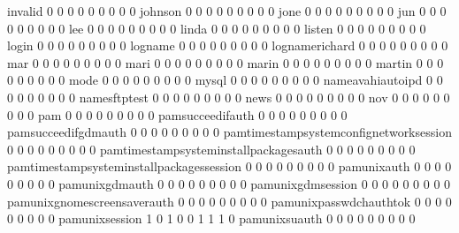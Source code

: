 \documentclass[compress,8pt]{beamer}
\begin{document}
\begin{frame}
\begin{Schunk}
  invalid                                    0   0   0   0   0   0   0   0   0
  johnson                                    0   0   0   0   0   0   0   0   0
  jone                                       0   0   0   0   0   0   0   0   0
  jun                                        0   0   0   0   0   0   0   0   0
  lee                                        0   0   0   0   0   0   0   0   0
  linda                                      0   0   0   0   0   0   0   0   0
  listen                                     0   0   0   0   0   0   0   0   0
  login                                      0   0   0   0   0   0   0   0   0
  logname                                    0   0   0   0   0   0   0   0   0
  lognamerichard                             0   0   0   0   0   0   0   0   0
  mar                                        0   0   0   0   0   0   0   0   0
  mari                                       0   0   0   0   0   0   0   0   0
  marin                                      0   0   0   0   0   0   0   0   0
  martin                                     0   0   0   0   0   0   0   0   0
  mode                                       0   0   0   0   0   0   0   0   0
  mysql                                      0   0   0   0   0   0   0   0   0
  nameavahiautoipd                           0   0   0   0   0   0   0   0   0
  namesftptest                               0   0   0   0   0   0   0   0   0
  news                                       0   0   0   0   0   0   0   0   0
  nov                                        0   0   0   0   0   0   0   0   0
  pam                                        0   0   0   0   0   0   0   0   0
  pamsucceedifauth                           0   0   0   0   0   0   0   0   0
  pamsucceedifgdmauth                        0   0   0   0   0   0   0   0   0
  pamtimestampsystemconfignetworksession     0   0   0   0   0   0   0   0   0
  pamtimestampsysteminstallpackagesauth      0   0   0   0   0   0   0   0   0
  pamtimestampsysteminstallpackagessession   0   0   0   0   0   0   0   0   0
  pamunixauth                                0   0   0   0   0   0   0   0   0
  pamunixgdmauth                             0   0   0   0   0   0   0   0   0
  pamunixgdmsession                          0   0   0   0   0   0   0   0   0
  pamunixgnomescreensaverauth                0   0   0   0   0   0   0   0   0
  pamunixpasswdchauthtok                     0   0   0   0   0   0   0   0   0
  pamunixsession                             1   0   1   0   0   1   1   1   0
  pamunixsuauth                              0   0   0   0   0   0   0   0   0

\end{Schunk}
\end{frame}
\end{document}
